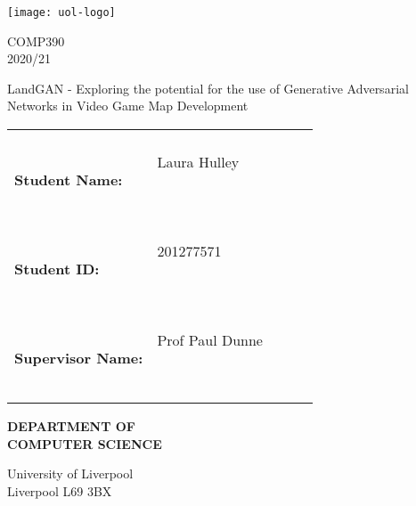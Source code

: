 \begin{titlepage}
    \begin{center}
        \texttt{[image: uol-logo]}

        \vspace{5em}

        \Large{COMP390}
        \vspace{1em}
        \Large{\\2020/21}

        \vspace{3em}

        \Large{LandGAN - Exploring the potential for the use of Generative Adversarial Networks in Video Game Map Development}

        \vspace{3em}

        \begin{tabular}{|lp{5.0cm}lll|}
            \hline
                                      &                    &  &   & \\
            \textbf{Student Name:}    & Laura Hulley

            \                         &                    &  &     \\
            \textbf{Student ID:}      & 201277571

            \                         &                    &  &     \\
            \textbf{Supervisor Name:} & Prof Paul Dunne

            \                         &                    &  &     \\
            \hline
        \end{tabular}

        \vspace{3em}

        \LARGE{{\textbf{DEPARTMENT OF\\
                        COMPUTER SCIENCE}}}

        \vspace{2em}

        University of Liverpool\\Liverpool L69 3BX

    \end{center}



\end{titlepage}